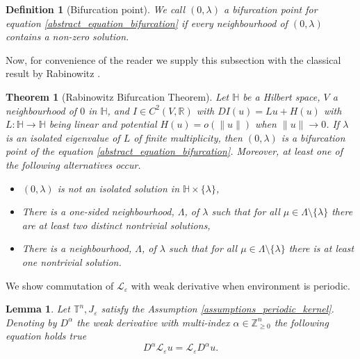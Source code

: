 \documentclass[12pt, a4paper]{article}
\theoremstyle{break}
\newtheorem{thm}{Theorem}[section]
\theoremstyle{break}
\theoremstyle{break}
\theoremstyle{break}
\newtheorem{lem}{Lemma}[section]
\theoremstyle{break}
\newtheorem{defi}{Definition}[section]
\newcommand{\Leo}{\mathcal{L}_{\varepsilon}}
\begin{document}
\begin{defi}[Bifurcation point]
    We call $(0, \lambda)$ a bifurcation point for equation \eqref{abstract_equation_bifurcation} if every neighbourhood of $(0, \lambda)$ contains a non-zero solution.
    \label{def:bifurcation_point}
\end{defi}

Now, for convenience of the reader we supply this subsection with the classical result by Rabinowitz \cite{Rabinowitz1977}.

\begin{thm}[Rabinowitz Bifurcation Theorem]
    Let $\mathbb{H}$ be a Hilbert space, $V$ a neighbourhood of $0$ in $\mathbb{H}$, and $I \in C^2\left(V, \mathbb{R}\right)$ with $DI(u) = Lu + H(u)$ with $L: \mathbb{H} \rightarrow \mathbb{H}$ being linear and potential $H(u) = o(\|u\|)$ when $\|u\| \rightarrow 0$. If $\lambda$ is an isolated eigenvalue of $L$ of finite multiplicity, then $(0, \lambda)$ is a bifurcation point of the equation \eqref{abstract_equation_bifurcation}.
    Moreover, at least one of the following alternatives occur.
    \begin{itemize}
        \item [(i)] $(0, \lambda)$ is not an isolated solution in $\mathbb{H} \times \{\lambda\} $,
        \item [(ii)] There is a one-sided neighbourhood, $\Lambda$, of $\lambda$ such that for all $\mu \in \Lambda \setminus \{\lambda\}$ there are at least two distinct nontrivial solutions,
        \item [(iii)] There is a neighbourhood, $\Lambda$, of $\lambda$ such that for all $\mu \in \Lambda \setminus \{\lambda\}$ there is at least one nontrivial solution.
    \end{itemize}
    \label{thm:rabinowitz_bifurcation}
\end{thm}

We show commutation of $\Leo$ with weak derivative when environment is periodic.

\begin{lem}
    Let $\mathbb{T}^n, J_\varepsilon$ satisfy the Assumption \ref{assumptions_periodic_kernel}. Denoting by $D^{\alpha}$ the weak derivative with multi-index $\alpha \in \mathbb{Z}_{\geq 0}^n$ the following equation holds true
    \begin{equation}
        D^\alpha \Leo u = \Leo D^\alpha u.
    \end{equation}
    \label{lem:commutation_formula}
\end{lem}
\end{document}
